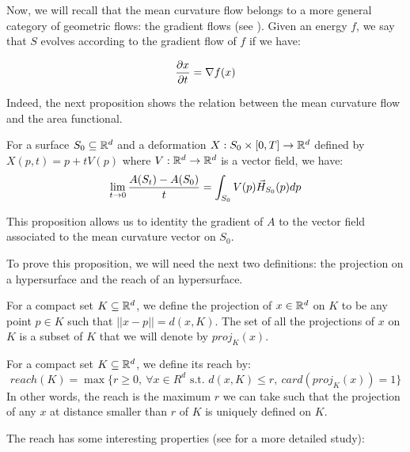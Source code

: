 Now, we will recall that the mean curvature flow belongs to a more general
category of geometric flows: the gradient flows (see
\cite{ilmanen1998lectures}). Given an energy $ f $, we say that $ S $ evolves
according to the gradient flow of $ f $ if we have:

$$ \frac{\partial{x}}{\partial{t}} = \nabla f(x) $$

Indeed, the next proposition shows the relation between the mean curvature flow
and the area functional.

\begin{proposition}
    For a surface $ S_0 \subseteq \mathbb{R}^d $ and a deformation $ X : S_0 \times [0, T]
    \to \mathbb{R}^d $ defined by $ X(p, t) = p + t V(p) $ where $ V : \mathbb{R}^d \to \mathbb{R}^d $ is a
    vector field, we have:
    \begin{equation}
        \lim\limits_{t \to 0} \frac{A(S_t) - A(S_0)}{t} = \int_{S_0} V(p)
        \vec{H}_{S_0}(p) dp
    \end{equation}
    \label{prop:gradient-area-functional}
\end{proposition}

This proposition allows us to identity the gradient of $ A $ to the vector
field associated to the mean curvature vector on $ S_0 $.

To prove this proposition, we will need the next two definitions: the projection
on a hypersurface and the reach of an hypersurface.

\begin{definition}
    For a compact set $ K \subseteq \mathbb{R}^d $, we define the projection of $ x \in
    \mathbb{R}^d $ on $ K $ to be any point $ p \in K $ such that $ || x - p || = d(x,
    K) $.
    The set of all the projections of $ x $ on $ K $ is a subset of $ K $
    that we will denote by $ proj_K(x) $.
\end{definition}

\begin{definition}
    For a compact set $ K \subseteq \mathbb{R}^d $, we define its reach by:
    \begin{equation}
        reach(K) = \max \{ r \geq 0,~\forall x \in R^d \text{ s.t. } d(x, K) \leq
        r,~ card(proj_K(x)) = 1 \}
    \end{equation}
    In other words, the reach is the maximum $ r $ we can take such that the
    projection of any $ x  $ at distance smaller than $ r $ of $ K $ is uniquely
    defined on $ K $.
\end{definition}

The reach has some interesting properties (see \cite{merigot2009detection} for a
more detailed study):

